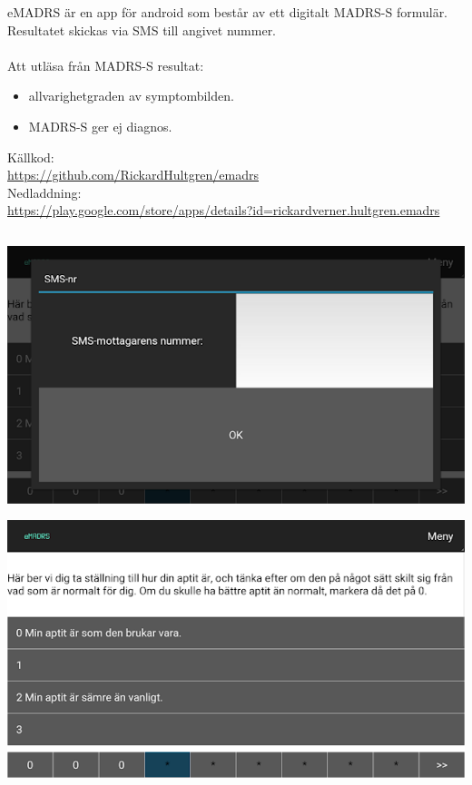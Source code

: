 \documentclass[english]{beamer}
\begin{document}
\subsection{}
\begin{frame}
\ \\ 
eMADRS {\"a}r en app f{\"o}r android som best{\aa}r av ett digitalt MADRS-S formul{\"a}r. Resultatet skickas via SMS till angivet nummer.\\\ \\

Att utl{\"a}sa fr{\aa}n MADRS-S resultat:
	\begin{itemize}
	\item allvarighetgraden av symptombilden.
	\item MADRS-S ger ej diagnos.
	\end{itemize}
K{\"a}llkod:\\
\href{https://github.com/RickardHultgren/emadrs}{\url{https://github.com/RickardHultgren/emadrs}}\\
Nedladdning:\\
\href{https://play.google.com/store/apps/details?id=rickardverner.hultgren.emadrs}{\url{https://play.google.com/store/apps/details?id=rickardverner.hultgren.emadrs}}

\end{frame}

\subsection{}
\begin{frame}
\includegraphics[scale=0.4]{1.png}
\end{frame}

\begin{frame}
\includegraphics[scale=0.4]{2.png}
\end{frame}
\end{document}
